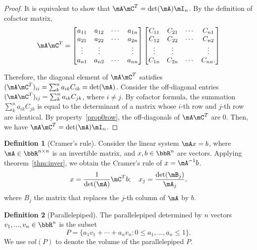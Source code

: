 \documentclass[11pt]{article}
\theoremstyle{plain}
\theoremstyle{definition}
\newtheorem{defn}{Definition}
\begin{document}
\begin{proof}
	It is equivalent to  show that $\mA \mC^T = \det(\mA) \mI_n$. By the definition of cofactor matrix,
	\begin{align}
		\mA  \mC^T = \begin{bmatrix}
			a_{11} & a_{12} &\cdots &a_{1n}\\
			a_{21} & a_{22} &\cdots &a_{2n}\\
			\vdots & \vdots & & \vdots\\
			a_{n1} & a_{n2} &\cdots &a_{nn}\\
		\end{bmatrix} \begin{bmatrix}
			C_{11} & C_{21} &\cdots &C_{n1}\\
			C_{12} & C_{22} &\cdots &C_{n2}\\
			\vdots & \vdots & & \vdots\\
			C_{1n} & C_{2n} &\cdots &C_{nn}.\\
		\end{bmatrix}
	\end{align}
	
	Therefore, the diagonal element of $\mA \mC^T$ satisfies $(\mA \mC^T)_{ii} = \sum_k^n a_{ik} C_{ik} = \det(\mA)$. Consider the off-diagonal entries $(\mA \mC^T)_{ij} = \sum_{k}^n a_{ik} C_{jk}$, where $i \neq j$. By cofactor formula, the summation   $ \sum_{k}^n a_{ik} C_{jk}$ is equal to the determinant of a matrix whose $i$-th row and $j$-th row are identical. By property~\ref{prop0row}, the off-diagonals of $\mA \mC^T$ are 0. Then, we have $\mA \mC^T = \det(\mA) \mI_n$.
\end{proof}

\begin{defn}[Cramer's rule]
Consider the linear system $\mA x=b$, where $\mA\in\bbR^{n \times n}$ is an invertible matrix, and $ x, b \in \bbR^n$ are vectors. Applying theorem~\ref{thm:inver}, we obtain the Cramer's rule of $x = \mA^{-1} b$.
\[  x = \frac{1}{\det(\mA)} \mC^T b; \quad x_j = \frac{\det(\mB_j)}{\mA_j}, \] 
	where $B_j$ the matrix that replaces the $j$-th column of $\mA$ by $b$.
\end{defn}

\begin{defn}[Parallelepiped]
	The parallelepiped determined by $n$ vectors $v_1,...,v_n \in \bbR^n$ is the subset 
	\[ P = \{ a_1 v_1 + \cdots + a_n v_n : 0 \leq a_1,...,a_n \leq 1 \}. \]
	 We use $vol(P)$ to denote the volume of the parallelepiped  $P$. 
\end{defn}
\end{document}
